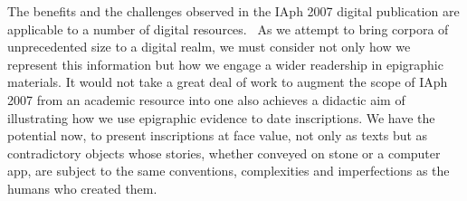 \documentclass[amsthm,ebook]{saparticle}
\begin{document}
The benefits and the challenges observed in the IAph 2007 digital publication are applicable to a number of digital
resources. \ As we attempt to bring corpora of unprecedented size to a digital realm, we must consider not only how we
represent this information but how we engage a wider readership in epigraphic materials. It would not take a great deal
of work to augment the scope of IAph 2007 from an academic resource into one also achieves a didactic aim of
illustrating how we use epigraphic evidence to date inscriptions. We have the potential now, to present inscriptions at
face value, not only as texts but as contradictory objects whose stories, whether conveyed on stone or a computer app,
are subject to the same conventions, complexities and imperfections as the humans who created them. 




\end{document}
